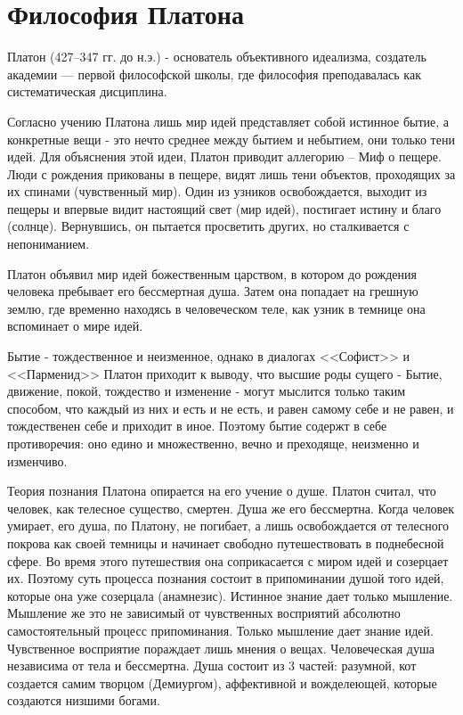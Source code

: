 \documentclass[12pt,a4paper]{article}
\begin{document}
	
	\section{Философия Платона~\checkmark}
	Платон (427–347 гг. до н.э.) - основатель объективного идеализма, создатель академии — первой философской школы, где философия преподавалась как систематическая дисциплина. 
	\par Согласно учению Платона лишь мир идей представляет собой истинное бытие, а конкретные вещи - это нечто среднее между бытием и небытием, они только тени идей. Для объяснения этой идеи, Платон приводит аллегорию -- Миф о пещере. Люди с рождения прикованы в пещере, видят лишь тени объектов, проходящих за их спинами (чувственный мир). Один из узников освобождается, выходит из пещеры и впервые видит настоящий свет (мир идей), постигает истину и благо (солнце). Вернувшись, он пытается просветить других, но сталкивается с непониманием.
	\par Платон объявил мир идей божественным царством, в котором до рождения человека пребывает его бессмертная душа. Затем она попадает на грешную землю, где временно находясь в человеческом теле, как узник в темнице она вспоминает о мире идей. 
	\par Бытие - тождественное и неизменное, однако в диалогах <<Софист>> и <<Парменид>> Платон приходит к выводу, что высшие роды сущего - Бытие, движение, покой, тождество и изменение - могут мыслится только таким способом, что каждый из них и есть и не есть, и равен самому себе и не равен, и тождественен себе и приходит в иное. Поэтому бытие содержт в себе противоречия: оно едино и множественно, вечно и преходяще, неизменно и изменчиво. 
	\par Теория познания Платона опирается на его учение о душе. Платон считал, что человек, как телесное существо, смертен. Душа же его бессмертна. Когда человек умирает, его душа, по Платону, не погибает, а лишь освобождается от телесного покрова как своей темницы и начинает свободно путешествовать в поднебесной сфере. Во время этого путешествия она соприкасается с миром идей и созерцает их. Поэтому суть процесса познания состоит в припоминании душой того идей, которые она уже созерцала (анамнезис). Истинное знание дает только мышление. Мышление же это не зависимый от чувственных восприятий абсолютно самостоятельный процесс припоминания. Только мышление дает знание идей. Чувственное восприятие пораждает лишь мнения о вещах. Человеческая душа независима от тела и бессмертна. Душа состоит из 3 частей: разумной, кот создается самим творцом (Демиургом), аффективной и вожделеющей, которые создаются низшими богами. 
	
\end{document}
